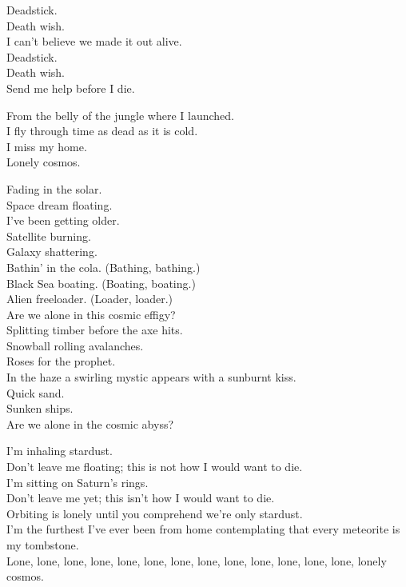 Deadstick. \\
Death wish. \\
I can't believe we made it out alive. \\
Deadstick. \\
Death wish. \\
Send me help before I die. \\





From the belly of the jungle where I launched. \\
I fly through time as dead as it is cold. \\
I miss my home. \\
Lonely cosmos. \\


Fading in the solar. \\
Space dream floating. \\
I've been getting older. \\
Satellite burning. \\
Galaxy shattering. \\
Bathin' in the cola. (Bathing, bathing.) \\
Black Sea boating. (Boating, boating.) \\
Alien freeloader. (Loader, loader.) \\
Are we alone in this cosmic effigy? \\

Splitting timber before the axe hits. \\
Snowball rolling avalanches. \\
Roses for the prophet. \\
In the haze a swirling mystic appears with a sunburnt kiss. \\
Quick sand. \\
Sunken ships. \\
Are we alone in the cosmic abyss? \\


I'm inhaling stardust. \\
Don't leave me floating; this is not how I would want to die. \\
I'm sitting on Saturn's rings. \\
Don't leave me yet; this isn't how I would want to die. \\
Orbiting is lonely until you comprehend we're only stardust. \\
I'm the furthest I've ever been from home contemplating that every meteorite is my tombstone. \\
Lone, lone, lone, lone, lone, lone, lone, lone, lone, lone, lone, lone, lone, lonely cosmos. \\

